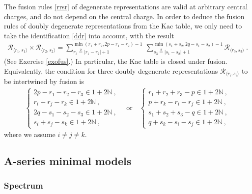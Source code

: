 \documentclass[12pt, a4paper, notitlepage, twoside]{report}
\numberwithin{equation}{section}
\theoremstyle{break}
\begin{document}
The fusion rules \eqref{rrsr} of degenerate representations are valid at arbitrary central charges, and do not depend on the central charge. In order to deduce the fusion rules of doubly degenerate representations from the Kac table, we only need to take the identification \eqref{ddr} into account, with the result
\begin{align}
  \boxed{\mathcal{R}_{\langle r_1,s_1 \rangle} \times \mathcal{R}_{\langle r_2,s_2 \rangle} = \sum_{r_3\overset{2}{=}|r_1-r_2|+1}^{\min(r_1+r_2,2p-r_1-r_2)-1}\ \sum_{s_3\overset{2}{=}|s_1-s_2|+1}^{\min(s_1+s_2,2q-s_1-s_2)-1} \mathcal{R}_{\langle r_3,s_3 \rangle}}\ .
\label{rrmm}
\end{align}
(See Exercise \ref{exofus}.) In particular, the Kac table is closed under fusion.
Equivalently, 
the condition for three doubly degenerate representations $\mathcal{R}_{\langle r_i,s_i \rangle}$ to be intertwined by fusion is 
\begin{align}
 \left\{\begin{array}{l}  2p-r_1-r_2-r_3\in 1+2{\mathbb{N}}\ , \\
 r_i+r_j-r_k \in 1 + 2{\mathbb{N}}\ , \\
2q-s_1-s_2-s_3\in 1+2{\mathbb{N}}\ , \\
 s_i+s_j-s_k \in 1 + 2{\mathbb{N}}\ , \end{array}\right.  
\quad \text{or} \quad
 \left\{\begin{array}{l}  r_1+r_2+r_3-p\in 1+2{\mathbb{N}}\ , \\
 p+r_k-r_i-r_j\in 1+2{\mathbb{N}} \ , \\
s_1+s_2+s_3-q\in 1+2{\mathbb{N}}\ , \\
 q+s_k-s_i-s_j\in 1+2{\mathbb{N}} \ ,\end{array}\right. 
 \label{mmfr}
\end{align}
where we assume $i\neq j\neq k$.


\subsection{A-series minimal models \label{secamm}}

\subsubsection{Spectrum}
\end{document}
